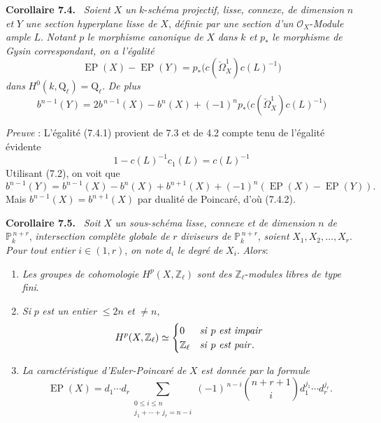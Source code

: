\documentclass[11pt]{article}
\newenvironment{statement}[1]{\par\medskip\noindent\textbf{#1.}\ }{\par\medskip}
\begin{document}
\begin{statement}{Corollaire 7.4}
\emph{Soient} $X$ \emph{un} $k$-\emph{schéma projectif, lisse, connexe, de dimension} $n$ \emph{et} $Y$ \emph{une section hyperplane lisse de} $X$, \emph{définie par une section d'un} $\mathcal O_X$-\emph{Module ample} $L$. \emph{Notant} $p$ \emph{le morphisme canonique de} $X$ \emph{dans} $k$ \emph{et} $p_*$ \emph{le morphisme de Gysin correspondant, on a l'égalité}
\[
\operatorname{EP}(X)-\operatorname{EP}(Y)=p_*\bigl(c(\check\Omega_X^1)c(L)^{-1}\bigr)
\tag{7.4.1}
\]
\emph{dans} $H^0(k,\mathrm{Q}_\ell)=\mathrm{Q}_\ell$. \emph{De plus}
\[
b^{n-1}(Y)=2b^{\,n-1}(X)-b^n(X)+(-1)^n p_*\bigl(c(\check\Omega_X^1)c(L)^{-1}\bigr)
\tag{7.4.2}
\]
\end{statement}

\emph{Preuve} : L'égalité (7.4.1) provient de 7.3 et de 4.2 compte tenu de l'égalité évidente
\[
1-c(L)^{-1}c_1(L)=c(L)^{-1}
\]
Utilisant (7.2), on voit que
\[
b^{n-1}(Y)=b^{n-1}(X)-b^n(X)+b^{n+1}(X)+(-1)^n(\operatorname{EP}(X)-\operatorname{EP}(Y)).
\]
Mais $b^{n-1}(X)=b^{n+1}(X)$ par dualité de Poincaré, d'où (7.4.2).

\begin{statement}{Corollaire 7.5}
\emph{Soit} $X$ \emph{un sous-schéma lisse, connexe et de dimension} $n$ \emph{de} $\mathbb P_k^{\,n+r}$, \emph{intersection complète globale de} $r$ \emph{diviseurs de} $\mathbb P_k^{\,n+r}$, \emph{soient} $X_1,X_2,\ldots,X_r$. \emph{Pour tout entier} $i\in(1,r)$, \emph{on note} $d_i$ \emph{le degré de} $X_i$. \emph{Alors}:
\begin{enumerate}[label=(\roman*)]
\item \emph{Les groupes de cohomologie} $H^p(X,\mathbb Z_\ell)$ \emph{sont des} $\mathbb Z_\ell$-\emph{modules libres de type fini}.
\item \emph{Si} $p$ \emph{est un entier} $\le 2n$ \emph{et} $\ne n$,
\[
H^p(X,\mathbb Z_\ell)\simeq
\begin{cases}
0&\text{\emph{si} }p\text{ \emph{est impair}}\\
\mathbb Z_\ell&\text{\emph{si} }p\text{ \emph{est pair}}.
\end{cases}
\]
\item \emph{La caractéristique d'Euler-Poincaré de} $X$ \emph{est donnée par la formule}
\[
\operatorname{EP}(X)
=d_1\cdots d_r
\sum_{\substack{0\le i\le n\\ j_1+\cdots+j_r=n-i}}
(-1)^{\,n-i}\binom{n+r+1}{i}
d_1^{j_1}\cdots d_r^{j_r}.
\]
\end{enumerate}
\end{statement}
\end{document}
